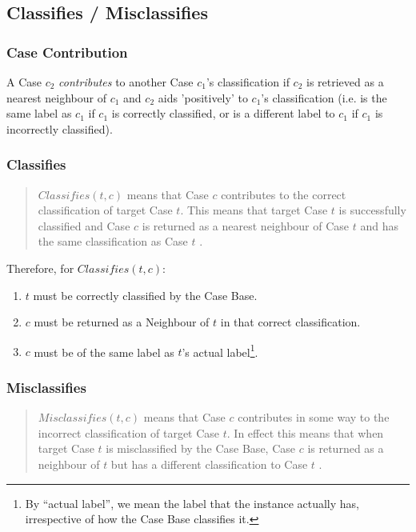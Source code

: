 \documentclass[a4paper,11pt]{report}
\begin{document}
\subsection{Classifies / Misclassifies}
\subsubsection{Case Contribution\label{sec:contributes}}
A Case $c_{2}$ \emph{contributes} to another Case $c_{1}$'s classification if $c_{2}$ is retrieved as a nearest neighbour of $c_{1}$ and $c_{2}$ aids 'positively' to $c_{1}$'s classification (i.e. is the same label as $c_{1}$ if $c_{1}$ is correctly classified, or is a different label to $c_{1}$ if  $c_{1}$ is incorrectly classified).
\subsubsection{Classifies}
\begin{quote}
$ Classifies(t, c) $ means that Case $c$ contributes to the correct classification of target Case $t$. This means that target Case $t$ is successfully classified and Case $c$ is returned as a nearest neighbour of Case $t$ and has the same classification as Case $t$ \citep{Delany2009}.
\end{quote}

Therefore, for $ Classifies(t, c) $:
\begin{enumerate}
	\item $t$ must be correctly classified by the Case Base.
	\item $c$ must be returned as a Neighbour of $t$ in that correct classification.
	\item $c$ must be of the same label as $t$'s actual label\footnote{By ``actual label'', we mean the label that the instance actually has, irrespective of how the Case Base classifies it.}.
\end{enumerate}

\subsubsection{Misclassifies}

\begin{quote}
$ Misclassifies(t, c ) $ means that Case $c$ contributes in some way to the incorrect classification of target Case $t$. In effect this means that when target Case $t$ is misclassified by the Case Base, Case $c$ is returned as a neighbour of $t$ but has a different classification to Case $t$ \citep{Delany2009}.
\end{quote}
\end{document}
